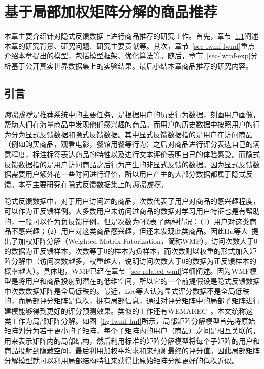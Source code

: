 \chapter{基于局部加权矩阵分解的商品推荐}
\label{chapter-lwmf}
本章主要介绍针对隐式反馈数据上进行商品推荐的研究工作。首先，章节~\ref{sect-lwmf-intro}阐述本章的研究背景、研究问题、研究主要贡献等。其次，章节~\ref{sec-lwmf-lwmf}重点介绍本章提出的模型，包括模型框架、优化算法等。随后，章节~\ref{sec-lwmf-exp}分析基于公开真实世界数据集上的实验结果。最后小结本章商品推荐的研究内容。

\section{引言}
\label{sect-lwmf-intro}


\textit{商品推荐}是推荐系统中的主要任务，是根据用户的历史行为数据，刻画用户画像，帮助人们在海量商品中发现他们感兴趣的商品。而用户的历史数据中按照用户的行为分为显式反馈数据和隐式反馈数据。其中显式反馈数据指的是用户在访问商品（例如购买商品，观看电影，餐馆用餐等行为）之后对商品进行评分表达自己的满意程度，标注标签表达商品的特性以及进行文本评价表明自己的体验感受。而隐式反馈数据指的是用户访问商品之后行为产生的非显式反馈的数据。因为显式反馈数据需要用户额外花一些时间进行评价，所以用户产生的大部分数据都属于隐式反馈。本章主要研究在隐式反馈数据集上的\textit{商品推荐}。

隐式反馈数据中，对于用户访问过的商品，次数代表了用户对商品的感兴趣程度，可以作为正反馈样例。大多数用户未访问过商品的数据对学习用户特征也是有帮助的，一般可以作为负反馈样例，但是次数为0代表了两种情况：（1）用户对这类商品不感兴趣；（2）用户对这类商品感兴趣，但还未发现此类商品。因此Hu等人~\cite{hu2008collaborative}提出了加权矩阵分解（Weighted Matrix Fatorization，简称WMF），访问次数大于0的数据为正反馈样本，次数等于0的样本为负样本，而次数则以权重的形式加入矩阵分解中（访问次数越多，权重越大，说明访问次数大于0的数据为正反馈样本的概率越大）。具体地，WMF已经在章节~\ref{sec-related-wmf}详细阐述。因为WMF模型是将用户和商品投射到潜在的低维空间，所以它的一个前提假设是隐式反馈数据中次数数据矩阵是全局低秩的。最近，Lee等人\cite{lee2013local,lee2014local}认为显式评分数据不是全局低秩的，而局部评分矩阵是低秩，拥有局部信息，通过对评分矩阵中的局部子矩阵进行建模能够得到更好的评分预测效果。类似的工作还有WEMAREC~\cite{chen2015wemarec}。本文统称这类工作为局部矩阵分解。如图~\ref{fig-lwmf-lmf}所示，局部矩阵分解模型首先将原始矩阵划分为若干更小的子矩阵，每个子矩阵内的用户（商品）之间是相互关联的，用来表示矩阵内的局部结构，然后利用标准的矩阵分解模型将每个子矩阵的用户和商品投射到隐藏空间，最后利用加权平均求和来预测最终的评分值。因此局部矩阵分解模型就可以利用局部结构特征来获得比原始矩阵分解更好的低秩近似。


